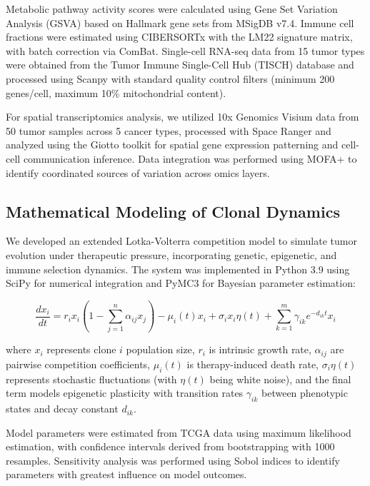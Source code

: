 \documentclass[12pt,a4paper]{article}
\begin{document}
Metabolic pathway activity scores were calculated using Gene Set Variation Analysis (GSVA) based on Hallmark gene sets from MSigDB v7.4. Immune cell fractions were estimated using CIBERSORTx with the LM22 signature matrix, with batch correction via ComBat. Single-cell RNA-seq data from 15 tumor types were obtained from the Tumor Immune Single-Cell Hub (TISCH) database and processed using Scanpy with standard quality control filters (minimum 200 genes/cell, maximum 10\% mitochondrial content).

For spatial transcriptomics analysis, we utilized 10x Genomics Visium data from 50 tumor samples across 5 cancer types, processed with Space Ranger and analyzed using the Giotto toolkit for spatial gene expression patterning and cell-cell communication inference. Data integration was performed using MOFA+ to identify coordinated sources of variation across omics layers.

\subsection{Mathematical Modeling of Clonal Dynamics}

We developed an extended Lotka-Volterra competition model to simulate tumor evolution under therapeutic pressure, incorporating genetic, epigenetic, and immune selection dynamics. The system was implemented in Python 3.9 using SciPy for numerical integration and PyMC3 for Bayesian parameter estimation:

\begin{equation}
\frac{dx_i}{dt} = r_i x_i \left(1 - \sum_{j=1}^{n} \alpha_{ij} x_j\right) - \mu_i(t) x_i + \sigma_i x_i \eta(t) + \sum_{k=1}^{m} \gamma_{ik} e^{-d_{ik}t} x_i
\end{equation}

where $x_i$ represents clone $i$ population size, $r_i$ is intrinsic growth rate, $\alpha_{ij}$ are pairwise competition coefficients, $\mu_i(t)$ is therapy-induced death rate, $\sigma_i \eta(t)$ represents stochastic fluctuations (with $\eta(t)$ being white noise), and the final term models epigenetic plasticity with transition rates $\gamma_{ik}$ between phenotypic states and decay constant $d_{ik}$.

Model parameters were estimated from TCGA data using maximum likelihood estimation, with confidence intervals derived from bootstrapping with 1000 resamples. Sensitivity analysis was performed using Sobol indices to identify parameters with greatest influence on model outcomes.
\end{document}
